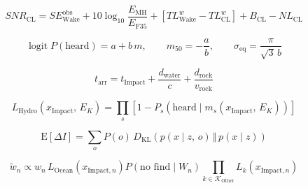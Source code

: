 \begin{equation}
  SNR_{\mathrm{CL}} = SE^{\mathrm{obs}}_{\mathrm{Wake}} + 10 \log_{10} \frac{E_{\mathrm{MH}}}{E_{\mathrm{F35}}} + \left[ TL^{w}_{\mathrm{Wake}} - TL^{w}_{\mathrm{CL}} \right] + B_{\mathrm{CL}} - NL_{\mathrm{CL}}
  \label{eq:32}
\end{equation}

\begin{equation}
  \operatorname{logit} P\left(\text{heard}\right) = a + b\, m, \qquad m_{50} = -\frac{a}{b}, \qquad \sigma_{\mathrm{eq}} = \frac{\pi}{\sqrt{3}\, b}
  \label{eq:33}
\end{equation}

\begin{equation}
  t_{\mathrm{arr}} = t_{\mathrm{Impact}} + \frac{d_{\mathrm{water}}}{c} + \frac{d_{\mathrm{rock}}}{v_{\mathrm{rock}}}
  \label{eq:34}
\end{equation}

\begin{equation}
  L_{\mathrm{Hydro}}\left(x_{\mathrm{Impact}},\, E_{K}\right) = \prod_{s} \left[ 1 - P_{s}\left(\text{heard} \mid m_{s}\left(x_{\mathrm{Impact}},\, E_{K}\right)\right) \right]
  \label{eq:35}
\end{equation}

\begin{equation}
  \mathrm{E}\left[\Delta I\right] = \sum_{o} P(o)\, D_{\mathrm{KL}}\left( p\left(x \mid z,\, o\right) \,\Vert\, p\left(x \mid z\right) \right)
  \label{eq:36}
\end{equation}

\begin{equation}
  \tilde{w}_{n} \propto w_{n}\, L_{\mathrm{Ocean}}\left(x_{\mathrm{Impact},n}\right) P\left(\text{no find} \mid W_{n}\right) \prod_{k \in \mathcal{K}_{\mathrm{Other}}} L_{k}\left(x_{\mathrm{Impact},n}\right)
  \label{eq:37}
\end{equation}

